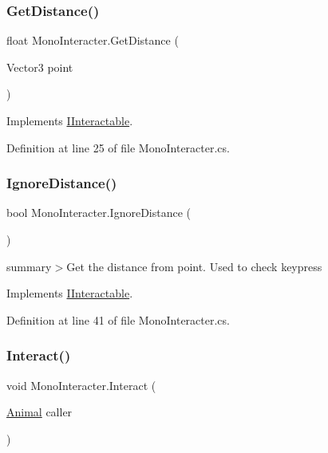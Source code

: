 \subsubsection{\texorpdfstring{Get\+Distance()}{GetDistance()}}
{\footnotesize\ttfamily float Mono\+Interacter.\+Get\+Distance (\begin{DoxyParamCaption}\item[{Vector3}]{point }\end{DoxyParamCaption})}



Implements \mbox{\hyperlink{interface_i_interactable_acde3047364ffe9a4ed107513feb21675}{I\+Interactable}}.



Definition at line 25 of file Mono\+Interacter.\+cs.

\mbox{\label{class_mono_interacter_adbdd4ad781e4fce595a14c2ee6258463}} 
\subsubsection{\texorpdfstring{Ignore\+Distance()}{IgnoreDistance()}}
{\footnotesize\ttfamily bool Mono\+Interacter.\+Ignore\+Distance (\begin{DoxyParamCaption}{ }\end{DoxyParamCaption})}



summary$>$Get the distance from point. Used to check keypress



Implements \mbox{\hyperlink{interface_i_interactable_ad184024a0cc6bce38ebcd77c0126fcc5}{I\+Interactable}}.



Definition at line 41 of file Mono\+Interacter.\+cs.

\mbox{\label{class_mono_interacter_ae732e07805c24cad447adf6218658f23}} 
\subsubsection{\texorpdfstring{Interact()}{Interact()}}
{\footnotesize\ttfamily void Mono\+Interacter.\+Interact (\begin{DoxyParamCaption}\item[{\mbox{\hyperlink{class_animal}{Animal}}}]{caller }\end{DoxyParamCaption})}



